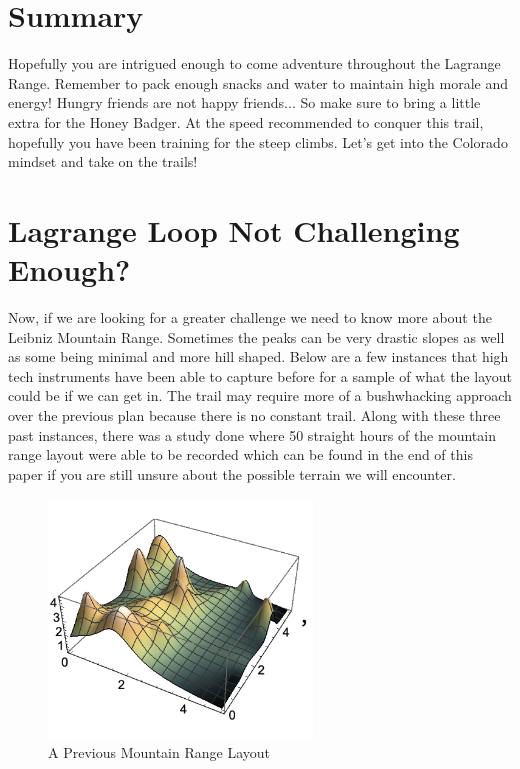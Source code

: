 \documentclass[12pt]{article}   %
\theoremstyle{definition}
\numberwithin{equation}{section}
\begin{document}
\section{Summary} \label{APPM2350proj02sec06}

\quad Hopefully you are intrigued enough to come adventure throughout the Lagrange Range. Remember to pack enough snacks and water to maintain high morale and energy! Hungry friends are not happy friends... So make sure to bring a little extra for the Honey Badger. At the speed recommended to conquer this trail, hopefully you have been training for the steep climbs. Let's get into the Colorado mindset and take on the trails!

\section{Lagrange Loop Not Challenging Enough?} \label{APPM2350proj02sec07}

\quad  Now, if we are looking for a greater challenge we need to know more about the Leibniz Mountain Range. Sometimes the peaks can be very drastic slopes as well as some being minimal and more hill shaped. Below are a few instances that high tech instruments have been able to capture before for a sample of what the layout could be if we can get in. The trail may require more of a bushwhacking approach over the previous plan because there is no constant trail. Along with these three past instances, there was a study done where 50 straight hours of the mountain range layout were able to be recorded which can be found in the end of this paper if you are still unsure about the possible terrain we will encounter.

\begin{figure} [h]
  \centering
  \includegraphics[width=7cm]{../images/mtn1.png}
  \caption{A Previous Mountain Range Layout}
\end{figure}
\end{document}
